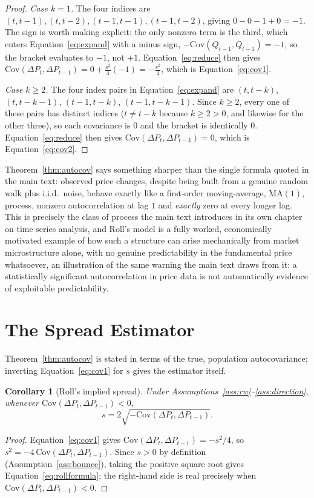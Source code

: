 \documentclass[11pt]{article}
\newtheorem{corollary}{Corollary}
\theoremstyle{remark}
\theoremstyle{definition}
\begin{document}
\begin{proof}
\emph{Case $k=1$.} The four indices are $(t,t-1),(t,t-2),(t-1,t-1),(t-1,t-2)$, giving $0 - 0 - 1 + 0 = -1$. The sign is worth making explicit: the only nonzero term is the third, which enters Equation~\eqref{eq:expand} with a minus sign, $-\mathrm{Cov}(Q_{t-1},Q_{t-1}) = -1$, so the bracket evaluates to $-1$, not $+1$. Equation~\eqref{eq:reduce} then gives $\mathrm{Cov}(\Delta P_t,\Delta P_{t-1}) = 0 + \tfrac{s^2}{4}(-1) = -\tfrac{s^2}{4}$, which is Equation~\eqref{eq:cov1}.

\emph{Case $k\ge2$.} The four index pairs in Equation~\eqref{eq:expand} are $(t,t-k)$, $(t,t-k-1)$, $(t-1,t-k)$, $(t-1,t-k-1)$. Since $k\ge2$, every one of these pairs has distinct indices ($t\ne t-k$ because $k\ge2>0$, and likewise for the other three), so each covariance is $0$ and the bracket is identically $0$. Equation~\eqref{eq:reduce} then gives $\mathrm{Cov}(\Delta P_t,\Delta P_{t-k})=0$, which is Equation~\eqref{eq:cov2}.
\end{proof}

Theorem~\ref{thm:autocov} says something sharper than the single formula quoted in the main text: observed price changes, despite being built from a genuine random walk plus i.i.d.\ noise, behave exactly like a first-order moving-average, $\mathrm{MA}(1)$, process, nonzero autocorrelation at lag $1$ and \emph{exactly} zero at every longer lag. This is precisely the class of process the main text introduces in its own chapter on time series analysis, and Roll's model is a fully worked, economically motivated example of how such a structure can arise mechanically from market microstructure alone, with no genuine predictability in the fundamental price whatsoever, an illustration of the same warning the main text draws from it: a statistically significant autocorrelation in price data is not automatically evidence of exploitable predictability.

\section{The Spread Estimator}
\label{sec:estimator}

Theorem~\ref{thm:autocov} is stated in terms of the true, population autocovariance; inverting Equation~\eqref{eq:cov1} for $s$ gives the estimator itself.

\begin{corollary}[Roll's implied spread]
\label{cor:roll}
Under Assumptions~\ref{ass:rw}--\ref{ass:direction}, whenever $\mathrm{Cov}(\Delta P_t,\Delta P_{t-1}) < 0$,
\begin{equation}
s = 2\sqrt{-\mathrm{Cov}(\Delta P_t,\Delta P_{t-1})}.
\label{eq:rollformula}
\end{equation}
\end{corollary}
\begin{proof}
Equation~\eqref{eq:cov1} gives $\mathrm{Cov}(\Delta P_t,\Delta P_{t-1}) = -s^2/4$, so $s^2 = -4\,\mathrm{Cov}(\Delta P_t,\Delta P_{t-1})$. Since $s>0$ by definition (Assumption~\ref{ass:bounce}), taking the positive square root gives Equation~\eqref{eq:rollformula}; the right-hand side is real precisely when $\mathrm{Cov}(\Delta P_t,\Delta P_{t-1})<0$.
\end{proof}
\end{document}
